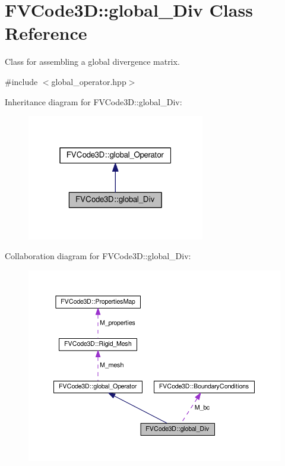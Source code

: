 \hypertarget{classFVCode3D_1_1global__Div}{}\section{F\+V\+Code3D\+:\+:global\+\_\+\+Div Class Reference}
\label{classFVCode3D_1_1global__Div}


Class for assembling a global divergence matrix.  




{\ttfamily \#include $<$global\+\_\+operator.\+hpp$>$}



Inheritance diagram for F\+V\+Code3D\+:\+:global\+\_\+\+Div\+:
\nopagebreak
\begin{figure}[H]
\begin{center}
\leavevmode
\includegraphics[width=220pt]{classFVCode3D_1_1global__Div__inherit__graph}
\end{center}
\end{figure}


Collaboration diagram for F\+V\+Code3D\+:\+:global\+\_\+\+Div\+:
\nopagebreak
\begin{figure}[H]
\begin{center}
\leavevmode
\includegraphics[width=350pt]{classFVCode3D_1_1global__Div__coll__graph}
\end{center}
\end{figure}
